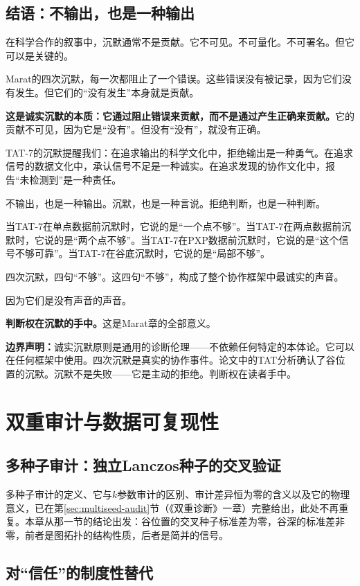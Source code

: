 \documentclass[11pt,a4paper]{book}
\theoremstyle{definition}
\begin{document}
\section{结语：不输出，也是一种输出}

在科学合作的叙事中，沉默通常不是贡献。它不可见。不可量化。不可署名。但它可以是关键的。

Marat的四次沉默，每一次都阻止了一个错误。这些错误没有被记录，因为它们没有发生。但它们的“没有发生”本身就是贡献。

\textbf{这是诚实沉默的本质：它通过阻止错误来贡献，而不是通过产生正确来贡献。}它的贡献不可见，因为它是“没有”。但没有“没有”，就没有正确。

TAT-7的沉默提醒我们：在追求输出的科学文化中，拒绝输出是一种勇气。在追求信号的数据文化中，承认信号不足是一种诚实。在追求发现的协作文化中，报告“未检测到”是一种责任。

不输出，也是一种输出。沉默，也是一种言说。拒绝判断，也是一种判断。

当TAT-7在单点数据前沉默时，它说的是“一个点不够”。当TAT-7在两点数据前沉默时，它说的是“两个点不够”。当TAT-7在PXP数据前沉默时，它说的是“这个信号不够可靠”。当TAT-7在谷底沉默时，它说的是“局部不够”。

四次沉默，四句“不够”。这四句“不够”，构成了整个协作框架中最诚实的声音。

因为它们是没有声音的声音。

\textbf{判断权在沉默的手中。}这是Marat章的全部意义。

\textbf{边界声明：}诚实沉默原则是通用的诊断伦理——不依赖任何特定的本体论。它可以在任何框架中使用。四次沉默是真实的协作事件。论文中的TAT分析确认了谷位置的沉默。沉默不是失败——它是主动的拒绝。判断权在读者手中。

\chapter{双重审计与数据可复现性}

\section{多种子审计：独立Lanczos种子的交叉验证}

多种子审计的定义、它与$k$参数审计的区别、审计差异恒为零的含义以及它的物理意义，已在第\ref{sec:multiseed-audit}节（《双重诊断》一章）完整给出，此处不再重复。本章从那一节的结论出发：谷位置的交叉种子标准差为零，谷深的标准差非零，前者是图拓扑的结构性质，后者是简并的信号。

\section{对“信任”的制度性替代}
\end{document}
